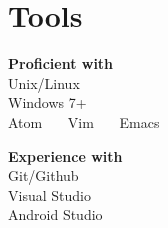\documentclass[print]{friggeri-cv} %
\begin{document}
\section{Tools}
\begin{minipage}{0.4 \linewidth}
\textbf{Proficient with}\\
Unix/Linux\\	  Windows 7+ \\ Atom  \, \, \, Vim \, \, \, Emacs
\end{minipage}
\begin{minipage}{0.4 \linewidth}
\textbf{Experience with}\\
Git/Github \\ Visual Studio \\ Android Studio  

\end{minipage}
\end{document}
